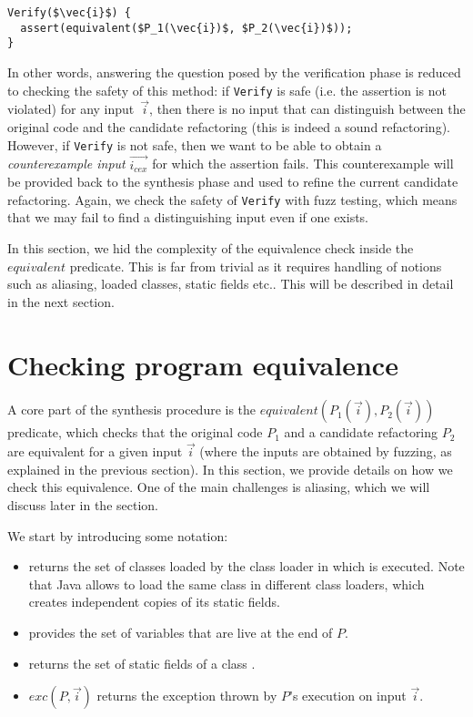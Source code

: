 \documentclass[10pt,conference]{IEEEtran}
\begin{document}
\begin{lstlisting}[mathescape=true,showstringspaces=false]
Verify($\vec{i}$) {
  assert(equivalent($P_1(\vec{i})$, $P_2(\vec{i})$));
}
\end{lstlisting}

In other words, answering the question posed by the verification
phase is reduced to checking the safety of this method: if
\texttt{Verify} is safe (i.e. the assertion is not violated) for any
input~$\vec{i}$, then there is no input that can distinguish
between the original code and the candidate refactoring (this
is indeed a sound refactoring). However, if \texttt{Verify} is not safe,
then we want to be able to obtain a {\em counterexample input}
$\vec{i_{cex}}$ for which the assertion fails.
%
This counterexample will be provided back to the synthesis phase and
used to refine the current candidate refactoring. Again, we check the
safety of \texttt{Verify} with fuzz testing,
which means that we may fail to find a distinguishing input even if one
exists.

In this section, we hid the complexity of the equivalence check inside
the $equivalent$ predicate. This is far from trivial as it requires handling
of notions such as aliasing, loaded classes, static fields etc.. This will be
described in detail in the next section.

\section{Checking program equivalence}\label{sec:equiv}

A core part of the synthesis procedure is the $equivalent(P_1(\vec{i}), P_2(\vec{i}))$ predicate,
which checks that the original code $P_1$ and a candidate refactoring $P_2$
are equivalent for a given input $\vec{i}$ (where the inputs are obtained by fuzzing, as explained in the previous section).
In this section, we provide details on how we check this equivalence.
One of the main challenges is aliasing, which we will discuss later in the section.

We start by introducing some notation:
\begin{itemize}
\item {} returns the set of classes loaded by the class loader
  in which  is executed. Note that Java allows to load the same class
in different class loaders, which creates independent copies of its
static fields.
\item {} provides the set of variables that are live
at the end of $P$. %
\item {} returns
  the set of static fields of a class .
\item $exc(P, \vec{i})$ returns the exception thrown by $P$'s execution on input $\vec{i}$.  
\end{itemize}  
\end{document}
